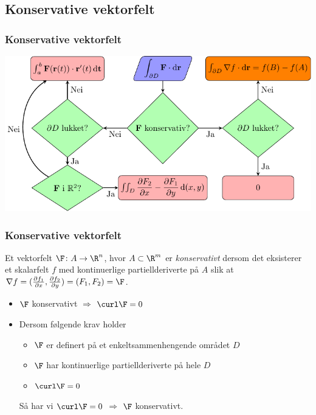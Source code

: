 \begin{frame}
  \subsection{Konservative vektorfelt}\label{subsec:Konservative-vektorfelt}
  \frametitle{Konservative vektorfelt}
  \includegraphics[scale=0.95]{../img/flytskjema-linjeintegral-2}
\end{frame}

\begin{frame}
  \frametitle{Konservative vektorfelt}
  \begin{definition}
    Et vektorfelt $\F \colon A \to \R^n$, hvor $A \subset \R^m$ er \emph{konservativt}
    dersom det eksisterer et skalarfelt $f$ med kontinuerlige partiellderiverte på
    $A$ slik at $\nabla f = (\frac{\partial f_1}{\partial x}, \frac{\partial
      f_2}{\partial y}) = (F_1, F_2) = \F$.
  \end{definition}
  \begin{theorem}
    \begin{itemize}
      \item $\F$ konservativt $\Longrightarrow$ $\curl \F = 0$
        \item Dersom følgende krav holder
        \begin{itemize}
          \item $\F$ er definert på et enkeltsammenhengende området $D$
          \item $\F$ har kontinuerlige partiellderiverte på hele $D$
          \item $\curl \F = 0$
        \end{itemize}
        Så har vi $\curl \F = 0$ $\Longrightarrow$ $\F$ konservativt.
    \end{itemize}
  \end{theorem}
\end{frame}

